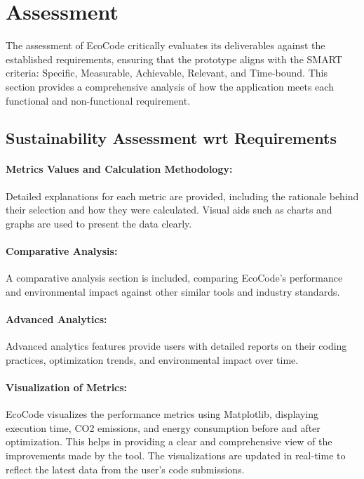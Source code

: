 \documentclass[conference,compsoc]{IEEEtran}
\begin{document}
\section{Assessment}
The assessment of EcoCode critically evaluates its deliverables against the established requirements, ensuring that the prototype aligns with the SMART criteria: Specific, Measurable, Achievable, Relevant, and Time-bound. This section provides a comprehensive analysis of how the application meets each functional and non-functional requirement.

\subsection{Sustainability Assessment wrt Requirements}
\label{sec:sustainability_assessment}

\paragraph{Metrics Values and Calculation Methodology:}
Detailed explanations for each metric are provided, including the rationale behind their selection and how they were calculated. Visual aids such as charts and graphs are used to present the data clearly.

\paragraph{Comparative Analysis:}
A comparative analysis section is included, comparing EcoCode's performance and environmental impact against other similar tools and industry standards.

\paragraph{Advanced Analytics:}
Advanced analytics features provide users with detailed reports on their coding practices, optimization trends, and environmental impact over time.

\paragraph{Visualization of Metrics:}
EcoCode visualizes the performance metrics using Matplotlib, displaying execution time, CO2 emissions, and energy consumption before and after optimization. This helps in providing a clear and comprehensive view of the improvements made by the tool. The visualizations are updated in real-time to reflect the latest data from the user's code submissions.
\end{document}
